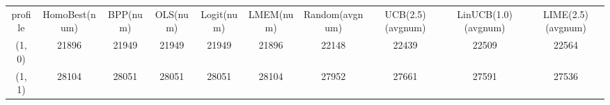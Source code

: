 \begin{tabular}{cccccccccc}
profile & HomoBest(num) & BPP(num) & OLS(num) & Logit(num) & LMEM(num) & Random(avgnum) & UCB(2.5)(avgnum) & LinUCB(1.0)(avgnum) & LIME(2.5)(avgnum)\\
(1, 0) & 21896 & 21949 & 21949 & 21949 & 21896 & 22148 & 22439 & 22509 & 22564\\
(1, 1) & 28104 & 28051 & 28051 & 28051 & 28104 & 27952 & 27661 & 27591 & 27536\\
\end{tabular}

